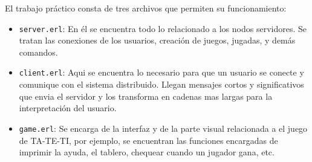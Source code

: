 \documentclass[a4paper]{article}
\newcommand{\blacktr}[0]{\item[$\blacktriangleright$]}
\begin{document}
El trabajo práctico consta de tres archivos que permiten su funcionamiento:
\begin{itemize}
  \blacktr \texttt{server.erl}: En él se encuentra todo lo relacionado a los nodos servidores. Se tratan las conexiones de los usuarios, creación de juegos, jugadas, y demás comandos.
  \blacktr \texttt{client.erl}: Aqui se encuentra lo necesario para que un usuario se conecte y comunique con el sistema distribuido. Llegan mensajes cortos y significativos que envia el servidor y los transforma en cadenas mas largas para la interpretación del usuario.
  \blacktr \texttt{game.erl}: Se encarga de la interfaz y de la parte visual relacionada a el juego de TA-TE-TI, por ejemplo, se encuentran las funciones encargadas de imprimir la ayuda, el tablero, chequear cuando un jugador gana, etc. 
\end{itemize}
\end{document}
